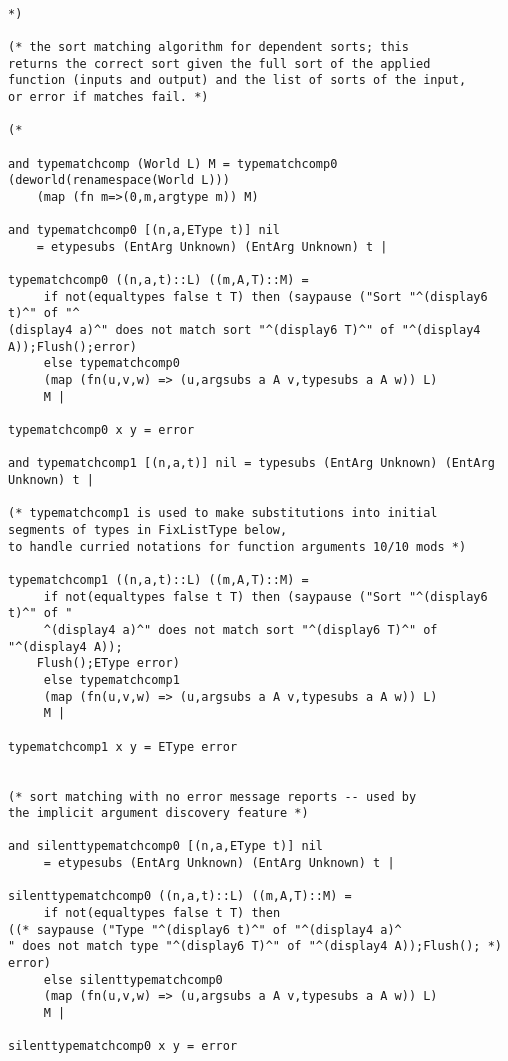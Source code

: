 \documentclass{article}
\begin{document}
\begin{verbatim}

*)

(* the sort matching algorithm for dependent sorts; this
returns the correct sort given the full sort of the applied
function (inputs and output) and the list of sorts of the input, 
or error if matches fail. *)

(*

and typematchcomp (World L) M = typematchcomp0 (deworld(renamespace(World L)))
    (map (fn m=>(0,m,argtype m)) M)

and typematchcomp0 [(n,a,EType t)] nil 
    = etypesubs (EntArg Unknown) (EntArg Unknown) t |

typematchcomp0 ((n,a,t)::L) ((m,A,T)::M) =
     if not(equaltypes false t T) then (saypause ("Sort "^(display6 t)^" of "^
(display4 a)^" does not match sort "^(display6 T)^" of "^(display4 A));Flush();error)
     else typematchcomp0
     (map (fn(u,v,w) => (u,argsubs a A v,typesubs a A w)) L)
     M |

typematchcomp0 x y = error

and typematchcomp1 [(n,a,t)] nil = typesubs (EntArg Unknown) (EntArg Unknown) t |

(* typematchcomp1 is used to make substitutions into initial
segments of types in FixListType below, 
to handle curried notations for function arguments 10/10 mods *)

typematchcomp1 ((n,a,t)::L) ((m,A,T)::M) =
     if not(equaltypes false t T) then (saypause ("Sort "^(display6 t)^" of "
     ^(display4 a)^" does not match sort "^(display6 T)^" of "^(display4 A));
    Flush();EType error)
     else typematchcomp1
     (map (fn(u,v,w) => (u,argsubs a A v,typesubs a A w)) L)
     M |

typematchcomp1 x y = EType error


(* sort matching with no error message reports -- used by
the implicit argument discovery feature *)

and silenttypematchcomp0 [(n,a,EType t)] nil 
     = etypesubs (EntArg Unknown) (EntArg Unknown) t |

silenttypematchcomp0 ((n,a,t)::L) ((m,A,T)::M) =
     if not(equaltypes false t T) then 
((* saypause ("Type "^(display6 t)^" of "^(display4 a)^
" does not match type "^(display6 T)^" of "^(display4 A));Flush(); *) error)
     else silenttypematchcomp0
     (map (fn(u,v,w) => (u,argsubs a A v,typesubs a A w)) L)
     M |

silenttypematchcomp0 x y = error



\end{verbatim}
\end{document}
